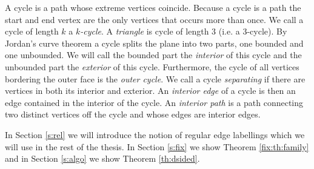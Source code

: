     A cycle is a path whose extreme vertices coincide. Because a cycle is a path the start and end vertex are the only vertices that occurs more than once. We call a cycle of length $k$  a \emph{$k$-cycle}. A \emph{triangle} is cycle of length $3$ (i.e. a $3$-cycle). By Jordan's curve theorem a cycle splits the plane into two parts, one bounded and one unbounded. We will call the bounded part the \emph{interior} of this cycle and the unbounded part the \emph{exterior} of this cycle.
    Furthermore, the cycle of all vertices bordering the outer face is the \emph{outer cycle}.
    We call a cycle \emph{separating} if there are vertices in both its interior and exterior.
    An \emph{interior edge} of a cycle is then an edge contained in the interior of the cycle.
    An \emph{interior path} is a path connecting two distinct vertices off the cycle and whose edges are interior edges.

  In Section \ref{s:rel} we will introduce the notion of regular edge labellings which we will use in the rest of the thesis.
  In Section \ref{s:fix} we show Theorem \ref{fix:th:family} and in Section \ref{s:algo} we show Theorem \ref{th:dsided}.
